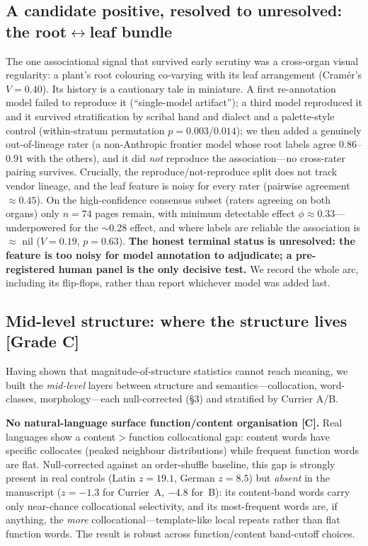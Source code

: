 \documentclass[11pt]{article}
\newcommand{\grade}[1]{{\small\textbf{[#1]}}}
\begin{document}
\subsection{A candidate positive, resolved to unresolved: the root$\leftrightarrow$leaf bundle}
The one associational signal that survived early scrutiny was a cross-organ visual
regularity: a plant's root colouring co-varying with its leaf arrangement (Cram\'er's
$V=0.40$). Its history is a cautionary tale in miniature. A first re-annotation model
failed to reproduce it (``single-model artifact''); a third model reproduced it and it
survived stratification by scribal hand and dialect and a palette-style control
(within-stratum permutation $p=0.003$/$0.014$); we then added a genuinely
out-of-lineage rater (a non-Anthropic frontier model whose root labels agree
$0.86$--$0.91$ with the others), and it did \emph{not} reproduce the association---no
cross-rater pairing survives. Crucially, the reproduce/not-reproduce split does not
track vendor lineage, and the leaf feature is noisy for every rater (pairwise
agreement $\approx 0.45$). On the high-confidence consensus subset (raters agreeing on
both organs) only $n=74$ pages remain, with minimum detectable effect $\phi\approx
0.33$---underpowered for the $\sim 0.28$ effect, and where labels are reliable the
association is $\approx$ nil ($V=0.19$, $p=0.63$). \textbf{The honest terminal status
is unresolved: the feature is too noisy for model annotation to adjudicate; a
pre-registered human panel is the only decisive test.} We record the whole arc,
including its flip-flops, rather than report whichever model was added last.

\subsection{Mid-level structure: where the structure lives \grade{Grade C}}
Having shown that magnitude-of-structure statistics cannot reach meaning, we built the
\emph{mid-level} layers between structure and semantics---collocation, word-classes,
morphology---each null-corrected (\S3) and stratified by Currier A/B.

\textbf{No natural-language surface function/content organisation \grade{C}.} Real
languages show a content$>$function collocational gap: content words have specific
collocates (peaked neighbour distributions) while frequent function words are flat.
Null-corrected against an order-shuffle baseline, this gap is strongly present in real
controls (Latin $z=19.1$, German $z=8.5$) but \emph{absent} in the manuscript
($z=-1.3$ for Currier~A, $-4.8$ for~B): its content-band words carry only near-chance
collocational selectivity, and its most-frequent words are, if anything, the \emph{more}
collocational---template-like local repeats rather than flat function words. The result
is robust across function/content band-cutoff choices.
\end{document}
